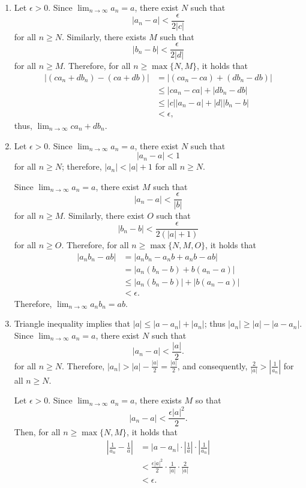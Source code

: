 \begin{dem}{}{}
	\begin{enumerate}
		\item Let \(\epsilon > 0\).
			Since \(\lim_{n\to\infty} a_n = a\), there exist \(N\) such that \[
				\left|a_n - a\right| < \frac{\epsilon}{2|c|}
			\] 
			for all \(n \geq N\).
			Similarly, there exists \(M\) such that \[
				\left| b_n - b \right| < \frac{\epsilon}{2|d|}
			\]
			for all \(n \geq M\).
			Therefore, for all \(n \geq \max\{N, M\}\), it holds that
			\begin{align*}
				\left|(ca_n + db_n) - (ca + db)\right| &= \left|(ca_n - ca) + (db_n - db)\right| \\
													   &\leq |ca_n - ca| + |db_n - db| \\
													   &\leq |c||a_n-a| + |d||b_n-b| \\
													   &< \epsilon,
			\end{align*}
			thus, \(\lim_{n\to\infty} ca_n + db_n\).
		\item Let \(\epsilon > 0\).
			Since \(\lim_{n\to\infty} a_n = a\), there exist \(N\) such that \[
				|a_n - a| < 1
			\] 
			for all \(n \geq N\); therefore, \(|a_n| < |a| + 1\) for all \(n \geq N\).

			Since \(\lim_{n\to\infty} a_n = a\), there exist \(M\) such that \[
				|a_n - a| < \frac{\epsilon}{|b|}
			\] 
			for all \(n \geq M\).
			Similarly, there exist \(O\) such that \[
				|b_n - b| < \frac{\epsilon}{2 (|a| + 1)}
			\] 
			for all \(n \geq O\).
			Therefore, for all  \(n \geq \max\{N, M, O\}\), it holds that
			\begin{align*}
				|a_nb_n - ab| &= |a_nb_n - a_nb + a_nb - ab| \\
							  &= |a_n(b_n - b) + b(a_n - a)| \\
							  &\leq |a_n(b_n - b)| + |b(a_n - a)| \\
							  &< \epsilon.
			\end{align*}
			Therefore, \(\lim_{n\to\infty} a_nb_n = ab\).

		\item Triangle inequality implies that \(|a| \leq |a - a_n| + |a_n|\); thus \(|a_n| \geq |a| - |a - a_n|\).
			Since \(\lim_{n\to\infty} a_n = a\), there exist \(N\) such that \[
				|a_n - a| < \frac{|a|}{2}.
			\]
			for all \(n \geq N\).  Therefore, \(|a_n| > |a| - \frac{|a|}{2} = \frac{|a|}{2}\), and consequently, \(\frac{2}{|a|} > \left|\frac{1}{a_n}\right|\) for all \(n \geq N\).

			Let \(\epsilon > 0\). Since \(\lim_{n\to\infty} a_n = a\), there exists \(M\) so that \[
				|a_n - a| < \frac{\epsilon |a|^2}{2}.
			\]
			Then, for all \(n \geq \max\{N, M\}\), it holds that
			\begin{align*}
				\left|\frac{1}{a_n} - \frac{1}{a}\right| &= |a - a_n|\cdot \left|\frac{1}{a}\right| \cdot \left|\frac{1}{a_n}\right|\\
				&< \frac{\epsilon |a|^2}{2} \cdot \frac{1}{|a|} \cdot \frac{2}{|a|} \\
				&< \epsilon.
			\end{align*}


\end{enumerate}
\end{dem}
